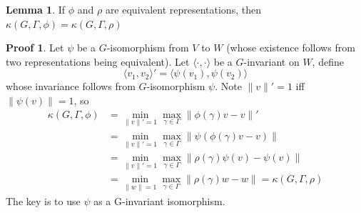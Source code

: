 \documentclass{book}
\newcommand{\inner}[1]{\langle #1 \rangle}
\newcommand{\norm}[1]{\lVert #1 \rVert}
\theoremstyle{definition}
\newtheorem{lemma}{Lemma}[chapter]
\theoremstyle{remarkstyle}
\newtheorem*{myproof}{Proof}%
\begin{document}
\begin{lemma}
    If $\phi$ and $\rho$ are equivalent representations, then $\kappa(G,\Gamma,\phi)=\kappa(G,\Gamma,\rho)$
\end{lemma}
\begin{myproof}
    Let $\psi$ be a $G$-isomorphism from $V$ to $W$ (whose existence follows from two representations being equivalent). Let $\inner{\cdot,\cdot}$ be a $G$-invariant on $W$, define 
    $$
    \inner{v_1,v_2}'=\inner{\psi(v_1),\psi(v_2)}
    $$
    whose invariance follows from $G$-isomorphism $\psi$. Note $\norm{v}'=1$ iff $\norm{\psi(v)}=1$, so 
    \begin{align*}
        \kappa(G,\Gamma,\phi) 
        &= \min_{\norm{v}'=1} \max_{\gamma\in\Gamma}\norm{\phi(\gamma)v-v}' \\
        &= \min_{\norm{v}'=1} \max_{\gamma\in\Gamma}\norm{\psi(\phi(\gamma)v-v)} \\
        &= \min_{\norm{v}'=1} \max_{\gamma\in\Gamma}\norm{\rho(\gamma)\psi(v)-\psi(v) } \\
        &= \min_{\norm{w}=1}\max_{\gamma\in\Gamma}\norm{\rho(\gamma)w-w} = \kappa(G,\Gamma,\rho)
    \end{align*}
    The key is to use $\psi$ as a G-invariant isomorphism. \newline 
\end{myproof}
\end{document}
